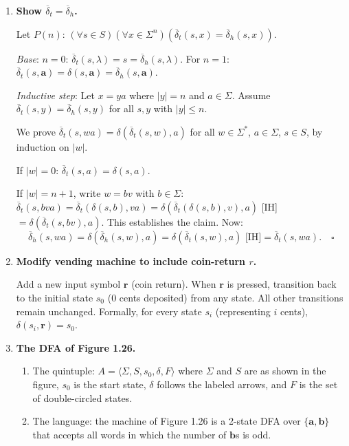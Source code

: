 \documentclass[11pt]{book}
\def\DBAR{\ensuremath{\overline{\delta}}}
\begin{document}
\begin{enumerate}[{1.}1.]

\item \textbf{Show $\DBAR_t = \DBAR_h$.}

Let $P(n)$: $(\forall s\in S)(\forall x\in\Sigma^n)(\DBAR_t(s,x)=\DBAR_h(s,x))$.

\textit{Base}: $n=0$: $\DBAR_t(s,\lambda)=s=\DBAR_h(s,\lambda)$. For $n=1$: $\DBAR_t(s,\mathbf{a})=\delta(s,\mathbf{a})=\DBAR_h(s,\mathbf{a})$.

\textit{Inductive step}: Let $x=ya$ where $|y|=n$ and $a\in\Sigma$. Assume $\DBAR_t(s,y)=\DBAR_h(s,y)$ for all $s,y$ with $|y|\leq n$.

We prove $\DBAR_t(s,wa)=\delta(\DBAR_t(s,w),a)$ for all $w\in\Sigma^*$, $a\in\Sigma$, $s\in S$, by induction on $|w|$.

If $|w|=0$: $\DBAR_t(s,a) = \delta(s,a)$. \checkmark

If $|w|=n+1$, write $w=bv$ with $b\in\Sigma$: $\DBAR_t(s,bva) = \DBAR_t(\delta(s,b),va) = \delta(\DBAR_t(\delta(s,b),v),a)$ [IH] $= \delta(\DBAR_t(s,bv),a)$. This establishes the claim. Now:
\[
\DBAR_h(s,wa) = \delta(\DBAR_h(s,w),a) = \delta(\DBAR_t(s,w),a) \text{ [IH]} = \DBAR_t(s,wa). \quad\square
\]

\item \textbf{Modify vending machine to include coin-return $r$.}

Add a new input symbol $\mathbf{r}$ (coin return). When $\mathbf{r}$ is pressed, transition back to the initial state $s_0$ (0 cents deposited) from any state. All other transitions remain unchanged. Formally, for every state $s_i$ (representing $i$ cents), $\delta(s_i, \mathbf{r}) = s_0$.

\item \textbf{The DFA of Figure 1.26.}

\begin{enumerate}
\item The quintuple: $A = \langle\Sigma, S, s_0, \delta, F\rangle$ where $\Sigma$ and $S$ are as shown in the figure, $s_0$ is the start state, $\delta$ follows the labeled arrows, and $F$ is the set of double-circled states.

\item The language: the machine of Figure 1.26 is a 2-state DFA over $\{\mathbf{a},\mathbf{b}\}$ that accepts all words in which the number of $\mathbf{b}$s is odd.
\end{enumerate}


\end{enumerate}
\end{document}
